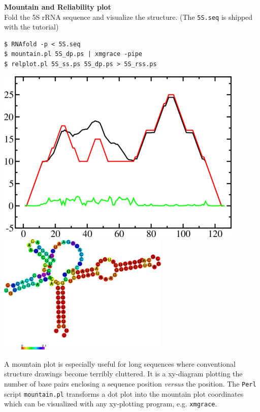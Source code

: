 \documentclass[]{article}
\begin{document}
\textbf{Mountain and Reliability plot}\\
 Fold the 5S rRNA sequence and visualize the structure. (The
\texttt{5S.seq} is shipped with the tutorial)

\begin{verbatim}
$ RNAfold -p < 5S.seq
$ mountain.pl 5S_dp.ps | xmgrace -pipe
$ relplot.pl 5S_ss.ps 5S_dp.ps > 5S_rss.ps
\end{verbatim}

\includegraphics{Figs/5S_mt.png}
\includegraphics{Figs/5S_rot.png}

A mountain plot is especially useful for long sequences where
conventional structure drawings become terribly cluttered. It is a
xy-diagram plotting the number of base pairs enclosing a sequence
position \emph{versus} the position. The \texttt{Perl} script
\texttt{mountain.pl} transforms a dot plot into the mountain plot
coordinates which can be visualized with any xy-plotting program, e.g.
\texttt{xmgrace}.
\end{document}
